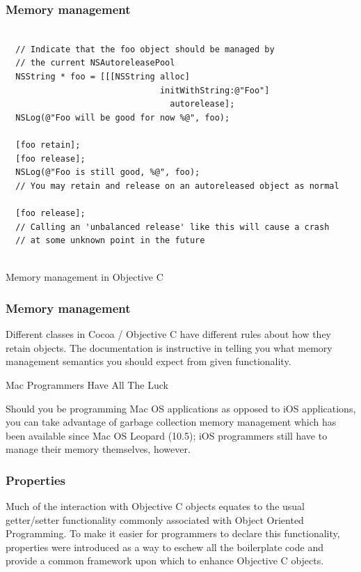 \documentclass[10pt]{beamer}
\begin{document}
\begin{frame}[fragile]
  \frametitle{Memory management}
  \begin{listing}[H]
    \begin{verbatim}
  
  // Indicate that the foo object should be managed by
  // the current NSAutoreleasePool
  NSString * foo = [[[NSString alloc]
                               initWithString:@"Foo"]
                                 autorelease];
  NSLog(@"Foo will be good for now %@", foo);
  
  [foo retain];
  [foo release];
  NSLog(@"Foo is still good, %@", foo);
  // You may retain and release on an autoreleased object as normal
  
  [foo release];
  // Calling an 'unbalanced release' like this will cause a crash
  // at some unknown point in the future
              
  \end{verbatim}
    \caption{Memory management in Objective C}
    \label{listing:10}
  \end{listing}

\end{frame}

\begin{frame}[fragile]
  \frametitle{Memory management}
  Different classes in Cocoa / Objective C have different rules about how they retain objects.  The documentation is instructive in telling you what memory management semantics you should expect from given functionality.
\begin{block}{Mac Programmers Have All The Luck}
  
  Should you be programming Mac OS applications as opposed to iOS applications,
  you can take advantage of garbage collection memory management which has been
  available since Mac OS Leopard (10.5); iOS programmers still have to manage their
  memory themselves, however.
              
  \end{block}

\end{frame}

    
\begin{frame}[fragile]
  \frametitle{Properties}
  Much of the interaction with Objective C objects equates to the usual getter/setter functionality commonly associated with Object Oriented Programming. To make it easier for programmers to declare this functionality, properties were introduced as a way to eschew all the boilerplate code and provide a common framework upon which to enhance Objective C objects.

\end{frame}
\end{document}
